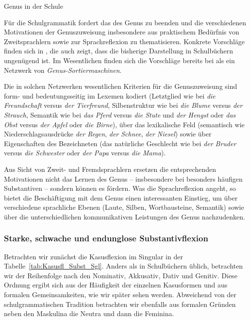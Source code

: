 \begin{Exkurs}{Genus in der Schule}
    
Für die Schulgrammatik fordert \citet[138--139]{Noack2016} das  des Genus zu beenden und die verschiedenen Motivationen der Genuszuweisung insbesondere aus praktischem Bedürfnis von Zweitsprachlern sowie zur Sprachreflexion zu thematisieren. Konkrete Vorschläge finden sich in \citet[136--138]{Noack2016}, die auch zeigt, dass die bisherige Darstellung in Schulbüchern ungenügend ist. Im Wesentlichen finden sich die Vorschläge bereits bei \citet[115--119]{Wegener1995} als ein Netzwerk von \textit{Genus-Sortiermaschinen}. 

Die in solchen Netzwerken wesentlichen Kriterien für die Genuszuweisung sind form- und bedeutungsseitig im Lexemen kodiert (Letztglied wie bei \textit{die Freundschaft} versus \textit{der Tierfreund}, Silbenstruktur wie bei \textit{die Blume} versus \textit{der Strauch}, Semantik wie bei \textit{das Pferd} versus \textit{die Stute} und \textit{der Hengst} oder \textit{das Obst} versus \textit{der Apfel} oder \textit{die Birne}), über das lexikalische Feld (semantisch wie \zB Niederschlagsausdrücke \textit{der Regen}, \textit{der Schnee}, \textit{der Niesel}) sowie über Eigenschaften des Bezeichneten (\zB das natürliche Geschlecht wie bei \textit{der Bruder} versus \textit{die Schwester} oder \textit{der Papa} versus \textit{die Mama}).   

Aus Sicht von Zweit- und Fremdsprachlern ersetzen die entsprechenden Motivationen nicht das Lernen des Genus -- insbesondere bei besonders häufigen Substantiven -- sondern können es fördern. Was die Sprachreflexion angeht, so bietet die Beschäftigung mit dem Genus einen interessanten Einstieg, um über verschiedene sprachliche Ebenen (Laute, Silben, Wortbausteine, Semantik) sowie über die unterschiedlichen kommunikativen Leistungen des Genus nachzudenken. 

\end{Exkurs}


\subsubsection{Starke, schwache und endunglose Substantivflexion}\label{subsubsection:st_sw_SFL}

Betrachten wir zunächst die Kasusflexion im Singular in der Tabelle~\ref{tab:Kasusfl_Subst_Sgl}. Anders als in Schulbüchern üblich, betrachten wir der Reihenfolge nach den Nominativ, Akkusativ, Dativ und Genitiv. Diese Ordnung ergibt sich aus der Häufigkeit der einzelnen Kasusformen und aus formalen Gemeinsamkeiten, wie wir später sehen werden. Abweichend von der schulgrammatischen Tradition betrachten wir ebenfalls aus formalen Gründen neben den Maskulina die Neutra und dann die Feminina.

